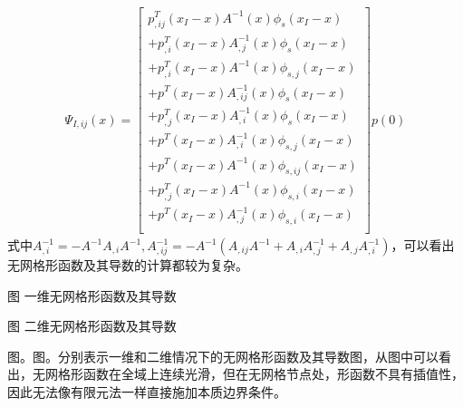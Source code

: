 \begin{equation}
\begin{split}
    \Psi_{I,ij}(x)=\left[\begin{matrix}
    p_{,ij}^{T}(x_I-x)A^{-1}(x)\phi_s(x_I-x)\\
    +p_{,i}^{T}(x_I-x)A_{,j}^{-1}(x)\phi_s(x_I-x)\\
    +p_{,i}^{T}(x_I-x)A^{-1}(x)\phi_{s,j}(x_I-x)\\
    +p^{T}(x_I-x)A_{,ij}^{-1}(x)\phi_s(x_I-x)\\
    +p_{,j}^{T}(x_I-x)A_{,i}^{-1}(x)\phi_s(x_I-x)\\
    +p^{T}(x_I-x)A_{,i}^{-1}(x)\phi_{s,j}(x_I-x)\\
    +p^{T}(x_I-x)A^{-1}(x)\phi_{s,ij}(x_I-x)\\
    +p_{,j}^{T}(x_I-x)A^{-1}(x)\phi_{s,i}(x_I-x)\\
    +p^{T}(x_I-x)A_{,j}^{-1}(x)\phi_{s,i}(x_I-x)\\
    \end{matrix}\right]
    p(0)
\end{split}
\end{equation}
式中$A_{,i}^{-1}=-A^{-1}A_{,i}A^{-1},A_{,ij}^{-1}=-A^{-1}(A_{,ij}A^{-1}+A_{,i}A_{,j}^{-1}+A_{,j}A_{,i}^{-1})$，可以看出无网格形函数及其导数的计算都较为复杂。\par
图 一维无网格形函数及其导数\\\par
图 二维无网格形函数及其导数\par
图。图。分别表示一维和二维情况下的无网格形函数及其导数图，从图中可以看出，无网格形函数在全域上连续光滑，但在无网格节点处，形函数不具有插值性，因此无法像有限元法一样直接施加本质边界条件。
